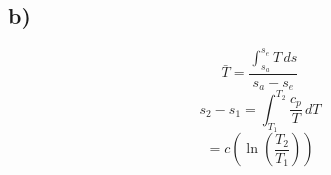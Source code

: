 

\subsection*{b)}
\[
\bar{T} = \frac{\int_{s_a}^{s_e} T \, ds}{s_a - s_e}
\]
\[
s_2 - s_1 = \int_{T_1}^{T_2} \frac{c_p}{T} \, dT
\]
\[
= c \left( \ln \left( \frac{T_2}{T_1} \right) \right)
\]